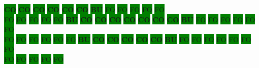 \colorbox{green}{\color[rgb]{0,0,0}\textbf{CO}}%
\colorbox{green}{\color[rgb]{0,0,0}\textbf{CO}}%
\colorbox{green}{\color[rgb]{0,0,0}\textbf{CO}}%
\colorbox{green}{\color[rgb]{0,0,0}\textbf{CO}}%
\colorbox{green}{\color[rgb]{0,0,0}\textbf{CO}}%
\colorbox{green}{\color[rgb]{0,0,0}\textbf{CO}}%
\colorbox{green}{\color[rgb]{1,0,0}\textbf{BU}}%
\colorbox{green}{\color[gray]{0.75}FO}%
\colorbox{green}{\color[gray]{0.75}FO}%
\colorbox{green}{\color[gray]{0.75}FO}%
\colorbox{green}{\color[gray]{0.75}FO}%
\colorbox{green}{\color[gray]{0.75}FO}%
\\
\colorbox{green}{\color[gray]{0.75}FO}%
\colorbox{green}{\color[gray]{0.75}FO}%
\colorbox{green}{\color[gray]{0.75}FO}%
\colorbox{green}{\color[gray]{0.75}FO}%
\colorbox{green}{\color[gray]{0.75}FO}%
\colorbox{green}{\color[rgb]{1,0,0}\textbf{BU}}%
\colorbox{green}{\color[rgb]{0,0,0}\textbf{CO}}%
\colorbox{green}{\color[rgb]{0,0,0}\textbf{CO}}%
\colorbox{green}{\color[rgb]{0,0,0}\textbf{CO}}%
\colorbox{green}{\color[rgb]{0,0,0}\textbf{CO}}%
\colorbox{green}{\color[rgb]{0,0,0}\textbf{CO}}%
\colorbox{green}{\color[rgb]{0,0,0}\textbf{CO}}%
\colorbox{green}{\color[rgb]{0,0,0}\textbf{CO}}%
\colorbox{green}{\color[rgb]{1,0,0}\textbf{BU}}%
\colorbox{green}{\color[gray]{0.75}FO}%
\colorbox{green}{\color[gray]{0.75}FO}%
\colorbox{green}{\color[gray]{0.75}FO}%
\colorbox{green}{\color[gray]{0.75}FO}%
\colorbox{green}{\color[gray]{0.75}FO}%
\colorbox{green}{\color[gray]{0.75}FO}%
\\
\colorbox{green}{\color[gray]{0.75}FO}%
\colorbox{green}{\color[gray]{0.75}FO}%
\colorbox{green}{\color[gray]{0.75}FO}%
\colorbox{green}{\color[gray]{0.75}FO}%
\colorbox{green}{\color[gray]{0.75}FO}%
\colorbox{green}{\color[gray]{0.75}FO}%
\colorbox{green}{\color[rgb]{1,0,0}\textbf{BU}}%
\colorbox{green}{\color[rgb]{0,0,0}\textbf{CO}}%
\colorbox{green}{\color[rgb]{0,0,0}\textbf{CO}}%
\colorbox{green}{\color[rgb]{0,0,0}\textbf{CO}}%
\colorbox{green}{\color[rgb]{0,0,0}\textbf{CO}}%
\colorbox{green}{\color[rgb]{0,0,0}\textbf{CO}}%
\colorbox{green}{\color[rgb]{1,0,0}\textbf{BU}}%
\colorbox{green}{\color[gray]{0.75}FO}%
\colorbox{green}{\color[gray]{0.75}FO}%
\colorbox{green}{\color[gray]{0.75}FO}%
\colorbox{green}{\color[gray]{0.75}FO}%
\colorbox{green}{\color[gray]{0.75}FO}%
\colorbox{green}{\color[gray]{0.75}FO}%
\colorbox{green}{\color[gray]{0.75}FO}%
\\
\colorbox{green}{\color[gray]{0.75}FO}%
\colorbox{green}{\color[gray]{0.75}FO}%
\colorbox{green}{\color[gray]{0.75}FO}%
\colorbox{green}{\color[gray]{0.75}FO}%
\colorbox{green}{\color[gray]{0.75}FO}%
